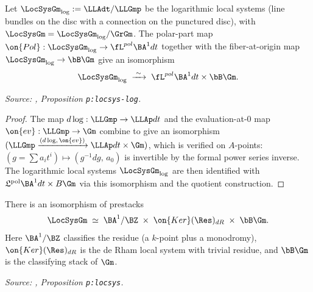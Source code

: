 \begin{proposition}
  \label{prop:locsys-log-decomp}
  Let $\LocSysGm_{\log} := \LLAdt/\LLGmp$ be the logarithmic local systems
  (line bundles on the disc with a connection on the punctured disc), with
  $\LocSysGm = \LocSysGm_{\log}/\GrGm$. The polar-part map
  $\on{Pol} : \LocSysGm_{\log} \to \fL^{pol}\BA^1 dt$ together with the
  fiber-at-origin map $\LocSysGm_{\log}\to \bB\Gm$ give an isomorphism
  \[
    \LocSysGm_{\log} \;\xrightarrow{\;\sim\;}\; \fL^{pol}\BA^1 dt \times \bB\Gm.
  \]

  \textit{Source: \cite{hilburn-raskin}, Proposition \texttt{p:locsys-log}.}
\end{proposition}

\begin{proof}
  The map $d\log : \LLGmp \to \LLAp dt$ and the evaluation-at-$0$ map
  $\on{ev} : \LLGmp \to \Gm$ combine to give an isomorphism
  $(\LLGmp \xrightarrow{(d\log,\,\on{ev})} \LLAp dt \times \Gm)$,
  which is verified on $A$-points: $(g = \sum a_i t^i) \mapsto
  (g^{-1}dg,\, a_0)$ is invertible by the formal power series inverse.
  The logarithmic local systems $\LocSysGm_{\log}$ are then identified
  with $\mathfrak{L}^{\mathrm{pol}}\BA^1 dt \times B\Gm$ via this
  isomorphism and the quotient construction.
\end{proof}

\begin{proposition}
  \label{prop:locsys-decomp}
  There is an isomorphism of prestacks
  \[
    \LocSysGm \;\simeq\; \BA^1/\BZ \;\times\; \on{Ker}(\Res)_{dR}
    \;\times\; \bB\Gm.
  \]
  Here $\BA^1/\BZ$ classifies the residue (a $k$-point plus a monodromy),
  $\on{Ker}(\Res)_{dR}$ is the de Rham local system with trivial residue,
  and $\bB\Gm$ is the classifying stack of $\Gm$.

  \textit{Source: \cite{hilburn-raskin}, Proposition \texttt{p:locsys}.}
\end{proposition}

